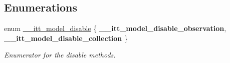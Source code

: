 \subsection*{Enumerations}
\begin{DoxyCompactItemize}
\item 
\hypertarget{group__model_ga1202045d9271afd9f59f323a9fe30622}{}enum \hyperlink{group__model_ga1202045d9271afd9f59f323a9fe30622}{\+\_\+\+\_\+itt\+\_\+model\+\_\+disable} \{ {\bfseries \+\_\+\+\_\+itt\+\_\+model\+\_\+disable\+\_\+observation}, 
{\bfseries \+\_\+\+\_\+itt\+\_\+model\+\_\+disable\+\_\+collection}
 \}\label{group__model_ga1202045d9271afd9f59f323a9fe30622}
\begin{DoxyCompactList}\small\item\em Enumerator for the disable methods. \end{DoxyCompactList}
\end{DoxyCompactItemize}
